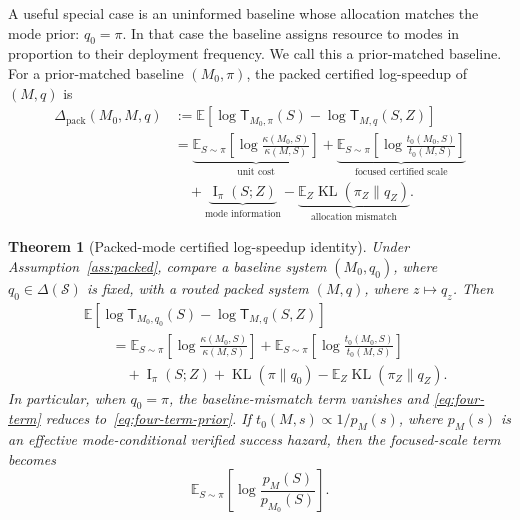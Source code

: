 \documentclass{article}
\newtheorem{theorem}{Theorem}
\DeclareMathOperator{\KL}{KL}
\DeclareMathOperator{\MI}{I}
\newcommand{\cS}{\mathcal{S}}
\newcommand{\E}{\mathbb{E}}
\begin{document}
A useful special case is an uninformed baseline whose allocation matches the mode prior:
\(q_0=\pi\).  In that case the baseline assigns resource to modes in proportion to their
deployment frequency.  We call this a prior-matched baseline.
For a prior-matched baseline \((M_0,\pi)\), the packed certified log-speedup of
\((M,q)\) is
\begin{equation}
\label{eq:four-term-prior}
\begin{aligned}
    \Delta_{\mathrm{pack}}(M_0,M,q)
    &:=
    \E\!\left[
        \log \mathsf T_{M_0,\pi}(S)
        -
        \log \mathsf T_{M,q}(S,Z)
    \right]
    \\
    &=
    \underbrace{
    \E_{S\sim\pi}
    \left[
        \log\frac{\kappa(M_0,S)}{\kappa(M,S)}
    \right]
    }_{\text{unit cost}}
    +
    \underbrace{
    \E_{S\sim\pi}
    \left[
        \log\frac{t_0(M_0,S)}{t_0(M,S)}
    \right]
    }_{\text{focused certified scale}}
    \\
    &\quad
    +
    \underbrace{\MI_\pi(S;Z)}_{\text{mode information}}
    -
    \underbrace{\E_Z\KL(\pi_Z\|q_Z)}_{\text{allocation mismatch}} .
\end{aligned}
\end{equation}

\begin{theorem}[Packed-mode certified log-speedup identity]
\label{thm:four-term}
Under Assumption~\ref{ass:packed}, compare a baseline system \((M_0,q_0)\), where
\(q_0\in\Delta(\cS)\) is fixed, with a routed packed system \((M,q)\), where
\(z\mapsto q_z\).  Then
\begin{equation}
\label{eq:four-term}
\begin{aligned}
&\E\!\left[
    \log \mathsf T_{M_0,q_0}(S)
    -
    \log \mathsf T_{M,q}(S,Z)
\right]
\\
&\qquad =
\E_{S\sim\pi}
\left[
    \log\frac{\kappa(M_0,S)}{\kappa(M,S)}
\right]
+
\E_{S\sim\pi}
    \left[
        \log\frac{t_0(M_0,S)}{t_0(M,S)}
    \right]
    \\
    &\qquad\quad
    +
\MI_\pi(S;Z)
+
\KL(\pi\|q_0)
-
\E_Z\KL(\pi_Z\|q_Z).
\end{aligned}
\end{equation}
In particular, when \(q_0=\pi\), the baseline-mismatch term vanishes and
\eqref{eq:four-term} reduces to~\eqref{eq:four-term-prior}.
If \(t_0(M,s)\propto 1/p_M(s)\), where \(p_M(s)\) is an effective mode-conditional
verified success hazard, then the focused-scale term becomes
\[
    \E_{S\sim\pi}
    \left[
        \log\frac{p_M(S)}{p_{M_0}(S)}
    \right].
\]
\end{theorem}
\end{document}
